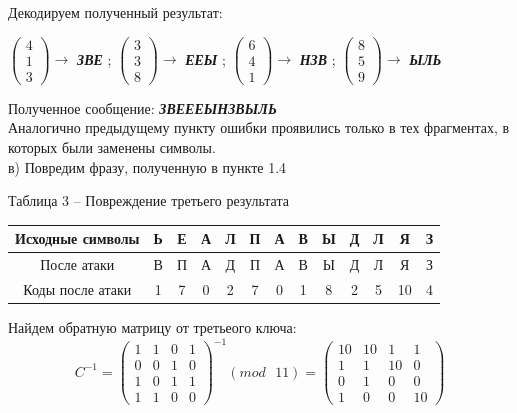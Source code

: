 \documentclass[a5paper, 10pt]{article}
\theoremstyle{definition}
\theoremstyle{plain}
\theoremstyle{remark}
\begin{document}
Декодируем полученный результат:
\begin{center}
 $ \begin{pmatrix}
4 \\
1\\
3
\end{pmatrix} \to$ \textbf{\textit{ЗВЕ}} ;
 $ \begin{pmatrix}
3 \\
3\\
8
\end{pmatrix} \to$ \textbf{\textit{ЕЕЫ}} ;
 $ \begin{pmatrix}
6 \\
4\\
1
\end{pmatrix} \to$ \textbf{\textit{НЗВ}} ;
 $ \begin{pmatrix}
8 \\
5\\
9
\end{pmatrix} \to$ \textbf{\textit{ЫЛЬ}}  \\

\end{center}
Полученное сообщение:  \textbf{\textit{\colorbox{green! 50}{ЗВЕ}\colorbox{red! 50}{ЕЕЫ}\colorbox{red! 50}{НЗВ}\colorbox{green! 50}{ЫЛЬ}}}\\
Аналогично предыдущему пункту ошибки проявились только в тех фрагментах, в которых были заменены символы.\\


 в) Повредим фразу, полученную в пункте 1.4
\begin{center}
Таблица 3 -- Повреждение третьего результата\\
\begin{tabular}{ |c|c|c|c|c|c|c|c|c|c|c|c|c| } 
 \hline
Исходные символы & Ь & Е & А & Л & П  & А & В  & Ы & Д  & Л & Я  & З\\
\hline
После атаки & В & П & А & Д & П  & А & В  & Ы & Д  & Л & Я  & З\\
 \hline
Коды после атаки & 1 & 7 & 0 & 2 & 7  & 0 & 1  & 8 & 2  & 5 & 10  & 4  \\
 \hline
\end{tabular}
\end{center}
Найдем обратную матрицу от третьеого ключа:
\begin{equation}
C^{-1} = 
\begin{pmatrix}
1 & 1 & 0 & 1\\
0 & 0 & 1 & 0 \\
1 & 0 & 1 & 1 \\
1 & 1 & 0 & 0
\end{pmatrix}^{-1} (mod \text{ }11)
=  \begin{pmatrix}
10 & 10 & 1 & 1\\
1 & 1 & 10 & 0 \\
0 & 1 & 0 & 0 \\
1 & 0 & 0 & 10
\end{pmatrix}
\end{equation}
\end{document}
